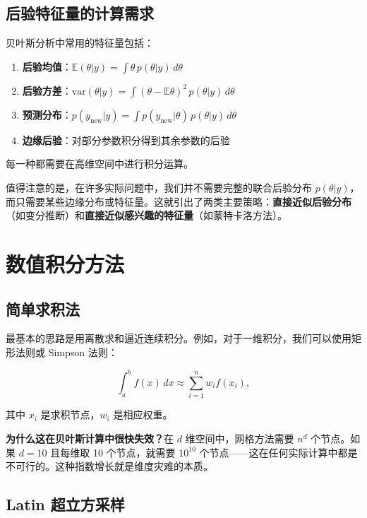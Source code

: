 \subsection{后验特征量的计算需求}

贝叶斯分析中常用的特征量包括：

\begin{enumerate}
  \item \textbf{后验均值}：$\mathbb{E}(\theta | y) = \int \theta \, p(\theta | y) \, d\theta$
  \item \textbf{后验方差}：$\text{var}(\theta | y) = \int (\theta - \mathbb{E}\theta)^2 \, p(\theta | y) \, d\theta$
  \item \textbf{预测分布}：$p(y_{\text{new}} | y) = \int p(y_{\text{new}} | \theta) \, p(\theta | y) \, d\theta$
  \item \textbf{边缘后验}：对部分参数积分得到其余参数的后验
\end{enumerate}

每一种都需要在高维空间中进行积分运算。

\begin{Remark}
  值得注意的是，在许多实际问题中，我们并不需要完整的联合后验分布 $p(\theta | y)$，而只需要某些边缘分布或特征量。这就引出了两类主要策略：\textbf{直接近似后验分布}（如变分推断）和\textbf{直接近似感兴趣的特征量}（如蒙特卡洛方法）。
\end{Remark}

\section{数值积分方法}

\subsection{简单求积法}

最基本的思路是用离散求和逼近连续积分。例如，对于一维积分，我们可以使用矩形法则或 Simpson 法则：

\[
\int_a^b f(x) \, dx \approx \sum_{i=1}^n w_i f(x_i),
\]

其中 $x_i$ 是求积节点，$w_i$ 是相应权重。

\textbf{为什么这在贝叶斯计算中很快失效？}在 $d$ 维空间中，网格方法需要 $n^d$ 个节点。如果 $d = 10$ 且每维取 10 个节点，就需要 $10^{10}$ 个节点——这在任何实际计算中都是不可行的。这种指数增长就是维度灾难的本质。

\subsection{Latin 超立方采样}

